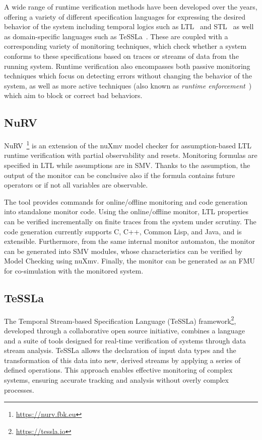 A wide range of runtime verification methods have been developed over the years, offering a variety of different specification languages for expressing the desired behavior of the system including temporal logics such as LTL~\cite{pnueli1977ltl} and STL~\cite{donze2013stl} as well as domain-specific languages such as TeSSLa~\cite{convent2018tessla}.
These are coupled with a corresponding variety of monitoring techniques, which check whether a system conforms to these specifications based on traces or streams of data from the running system.
Runtime verification also encompasses both passive monitoring techniques which focus on detecting errors without changing the behavior of the system, as well as more active techniques (also known as \emph{runtime enforcement}~\cite{falcone2010runtimeenforcement}) which aim to block or correct bad behaviors.

\subsection{NuRV}

NuRV~\cite{CimattiTT19a}\footnote{\url{https://nurv.fbk.eu}} is an
extension of the nuXmv model checker for assumption-based LTL runtime
verification with partial observability and resets. Monitoring
formulas are specified in LTL while assumptions are in SMV. Thanks to the
assumption, the output of the monitor can be conclusive also if the
formula contains future operators or if not all variables are
observable.

The tool provides commands for online/offline monitoring and code
generation into standalone monitor code. Using the online/offline
monitor, LTL properties can be verified incrementally on finite traces
from the system under scrutiny. The code generation currently supports
C, C++, Common Lisp, and Java, and is extensible. Furthermore, from the
same internal monitor automaton, the monitor can be generated into SMV
modules, whose characteristics can be verified by Model Checking using
nuXmv. Finally, the monitor can be generated as an FMU for
co-simulation with the monitored system.

\subsection{TeSSLa}
The Temporal Stream-based Specification Language (TeSSLa) framework\footnote{\url{https://tessla.io}}, developed through a collaborative open source initiative, combines a language and a suite of tools designed for real-time verification of systems through data stream analysis. TeSSLa allows the declaration of input data types and the transformation of this data into new, derived streams by applying a series of defined operations. This approach enables effective monitoring of complex systems, ensuring accurate tracking and analysis without overly complex processes.


